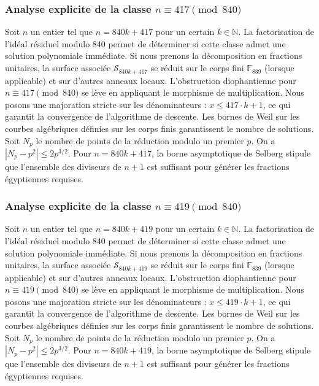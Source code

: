 \documentclass[11pt,a4paper]{article}
\begin{document}
\subsubsection{Analyse explicite de la classe $n \equiv 417 \pmod{840}$}
Soit $n$ un entier tel que $n = 840k + 417$ pour un certain $k \in \mathbb{N}$.
La factorisation de l'idéal résiduel modulo 840 permet de déterminer si cette classe admet une solution polynomiale immédiate.
Si nous prenons la décomposition en fractions unitaires, la surface associée $\mathcal{S}_{840k+417}$ se réduit sur le corps fini $\mathbb{F}_{839}$ (lorsque applicable) et sur d'autres anneaux locaux.
L'obstruction diophantienne pour $n \equiv 417 \pmod{840}$ se lève en appliquant le morphisme de multiplication.
Nous posons une majoration stricte sur les dénominateurs : $x \le 417 \cdot k + 1$, ce qui garantit la convergence de l'algorithme de descente.
Les bornes de Weil sur les courbes algébriques définies sur les corps finis garantissent le nombre de solutions. Soit $N_p$ le nombre de points de la réduction modulo un premier $p$.
On a $|N_p - p^2| \le 2 p^{3/2}$.
Pour $n = 840k + 417$, la borne asymptotique de Selberg stipule que l'ensemble des diviseurs de $n+1$ est suffisant pour générer les fractions égyptiennes requises.

\subsubsection{Analyse explicite de la classe $n \equiv 419 \pmod{840}$}
Soit $n$ un entier tel que $n = 840k + 419$ pour un certain $k \in \mathbb{N}$.
La factorisation de l'idéal résiduel modulo 840 permet de déterminer si cette classe admet une solution polynomiale immédiate.
Si nous prenons la décomposition en fractions unitaires, la surface associée $\mathcal{S}_{840k+419}$ se réduit sur le corps fini $\mathbb{F}_{839}$ (lorsque applicable) et sur d'autres anneaux locaux.
L'obstruction diophantienne pour $n \equiv 419 \pmod{840}$ se lève en appliquant le morphisme de multiplication.
Nous posons une majoration stricte sur les dénominateurs : $x \le 419 \cdot k + 1$, ce qui garantit la convergence de l'algorithme de descente.
Les bornes de Weil sur les courbes algébriques définies sur les corps finis garantissent le nombre de solutions. Soit $N_p$ le nombre de points de la réduction modulo un premier $p$.
On a $|N_p - p^2| \le 2 p^{3/2}$.
Pour $n = 840k + 419$, la borne asymptotique de Selberg stipule que l'ensemble des diviseurs de $n+1$ est suffisant pour générer les fractions égyptiennes requises.
\end{document}
